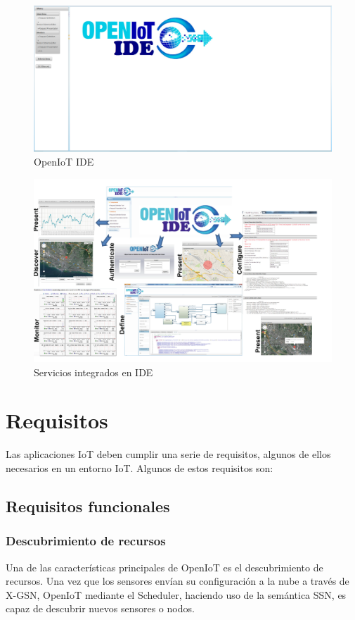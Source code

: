 \documentclass[12pt, twoside]{book}
\begin{document}
\begin{figure}[H]
\centering
\includegraphics[scale=0.3]{images/idecore_figure}
\caption{OpenIoT IDE}\label{L0421}
\end{figure}

\begin{figure}[H]
\centering
\includegraphics[scale=0.55]{images/idecoretools_capture}
\caption{Servicios integrados en IDE}\label{L0421}
\end{figure}

\section{Requisitos}
Las aplicaciones IoT deben cumplir una serie de requisitos, algunos de ellos necesarios en un entorno IoT. Algunos de estos requisitos son:


\subsection{Requisitos funcionales}
\subsubsection*{Descubrimiento de recursos}
Una de las características principales de OpenIoT es el descubrimiento de recursos. Una vez que los sensores envían su configuración a la nube a través de X-GSN, OpenIoT mediante el Scheduler, haciendo uso de la semántica SSN, es capaz de descubrir nuevos sensores o nodos.
\end{document}
